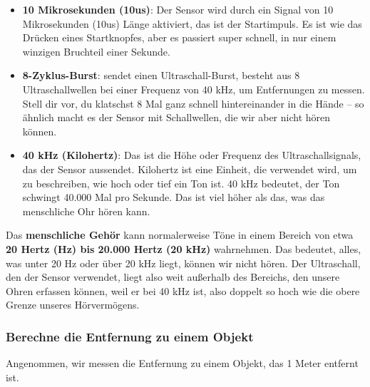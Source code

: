 \documentclass{vorlage-design-main}
\begin{document}
\begin{itemize}
\item
  \textbf{10 Mikrosekunden (10us)}: Der Sensor wird durch ein Signal von
  10 Mikrosekunden (10us) Länge aktiviert, das ist der Startimpuls. Es
  ist wie das Drücken eines Startknopfes, aber es passiert super
  schnell, in nur einem winzigen Bruchteil einer Sekunde.
\item
  \textbf{8-Zyklus-Burst}: sendet einen Ultraschall-Burst, besteht aus 8
  Ultraschallwellen bei einer Frequenz von 40 kHz, um Entfernungen zu
  messen. Stell dir vor, du klatschst 8 Mal ganz schnell hintereinander
  in die Hände -- so ähnlich macht es der Sensor mit Schallwellen, die
  wir aber nicht hören können.
\item
  \textbf{40 kHz (Kilohertz)}: Das ist die Höhe oder Frequenz des
  Ultraschallsignals, das der Sensor aussendet. Kilohertz ist eine
  Einheit, die verwendet wird, um zu beschreiben, wie hoch oder tief ein
  Ton ist. 40 kHz bedeutet, der Ton schwingt 40.000 Mal pro Sekunde. Das
  ist viel höher als das, was das menschliche Ohr hören kann.
\end{itemize}

Das \textbf{menschliche Gehör} kann normalerweise Töne in einem Bereich
von etwa \textbf{20 Hertz (Hz) bis 20.000 Hertz (20 kHz)} wahrnehmen.
Das bedeutet, alles, was unter 20 Hz oder über 20 kHz liegt, können wir
nicht hören. Der Ultraschall, den der Sensor verwendet, liegt also weit
außerhalb des Bereichs, den unsere Ohren erfassen können, weil er bei 40
kHz ist, also doppelt so hoch wie die obere Grenze unseres Hörvermögens.

\hypertarget{berechne-die-entfernung-zu-einem-objekt}{%
\subsubsection{Berechne die Entfernung zu einem
Objekt}\label{berechne-die-entfernung-zu-einem-objekt}}

Angenommen, wir messen die Entfernung zu einem Objekt, das 1 Meter
entfernt ist.
\end{document}
